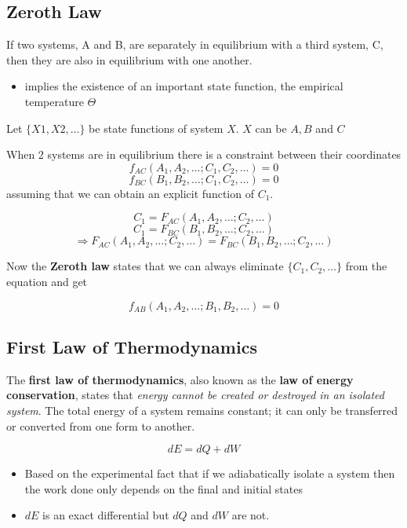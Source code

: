 \documentclass{article}
\begin{document}
\subsection{Zeroth Law}
If two systems, A and B, are separately in equilibrium with a third system, C, then they are also in equilibrium with one
another.
\begin{itemize}
    \item implies the existence of an important state function, the empirical temperature $ \Theta$

  

  


\end{itemize}
Let $ \{X1, X2, \ldots\} $ be state functions of system $X$. $X$ can be $A,B$ and $C$

When 2 systems are in equilibrium there is a
constraint between their coordinates
  $$f_{AC}(A_1, A_2, \ldots ; C_1, C_2, \ldots) = 0$$
  $$f_{BC}(B_1, B_2, \ldots ; C_1, C_2, \ldots) = 0$$
 assuming that we can obtain an explicit function of $C_1$.

 $$C_1 = F_{AC}(A_1, A_2, \ldots ; C_2,\ldots)$$
 $$C_1 = F_{BC}(B_1, B_2, \ldots ; C_2,\ldots)$$
 $$\Rightarrow F_{AC}(A_1, A_2, \ldots ; C_2,\ldots) = F_{BC}(B_1, B_2,\ldots ; C_2,\ldots)$$

Now the \textbf{Zeroth law} states that we can always eliminate $\{C_1, C_2, \ldots\}$ from the equation and get

$$f_{AB}(A_1, A_2, \ldots ; B_1, B_2, \ldots) = 0$$

\subsection{First Law of Thermodynamics}
The \textbf{first law of thermodynamics}, also known as the \textbf{law of energy conservation}, states that \textit{energy cannot be created or destroyed in an isolated system}. The total energy of a system remains constant; it can only be transferred or converted from one form to another.

$$dE = dQ + dW$$

\begin{itemize}
    \item Based on the experimental fact that if we adiabatically isolate a system then the work done only depends on the final
and initial states
     \item $dE$ is an exact differential but $dQ$ and $dW$ are not.
\end{itemize}
\end{document}
